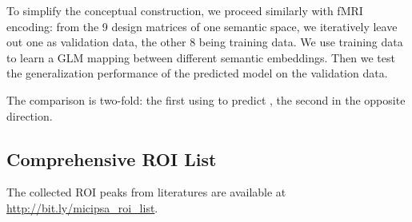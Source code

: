 To simplify the conceptual construction, we proceed similarly with fMRI encoding: from the 9 design matrices of one semantic space, we iteratively leave out one as validation data, the other 8 being training data. We use training data to learn a GLM mapping between different semantic embeddings. Then we test the generalization performance of the predicted model on the validation data. 

The comparison is two-fold: the first using  to predict , the second in the opposite direction.
\subsection{Comprehensive ROI List}
\label{appsubsc:roilist}

The collected ROI peaks from literatures are available at \url{http://bit.ly/micipsa_roi_list}.